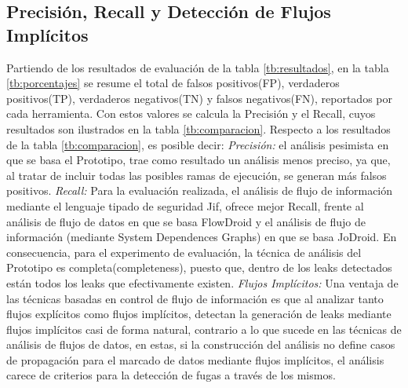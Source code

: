\subsection{Precisión, Recall y Detección de Flujos Implícitos}
Partiendo de los resultados de evaluación de la tabla \ref{tb:resultados}, 
en la tabla \ref{tb:porcentajes} se resume el total de falsos positivos(FP),
verdaderos positivos(TP), verdaderos negativos(TN) y falsos negativos(FN),
reportados por cada herramienta. Con estos valores se calcula la Precisión y el
Recall, cuyos resultados son ilustrados en la tabla
\ref{tb:comparacion}.\newline 
Respecto a los resultados de la tabla \ref{tb:comparacion}, es posible decir: 
\emph{Precisión:} el análisis pesimista en que se basa el Prototipo, trae como
resultado un análisis menos preciso, ya que, al tratar de incluir todas las
posibles ramas de ejecución, se generan más falsos positivos.\newline 
\emph{Recall:} Para la evaluación realizada, el análisis de flujo de información
mediante el lenguaje tipado de seguridad Jif, ofrece mejor Recall, frente al análisis
de flujo de datos en que se basa FlowDroid y el análisis de flujo de información
(mediante System Dependences Graphs) en que se basa JoDroid. En consecuencia,
para el experimento de evaluación, la técnica de análisis del Prototipo es
completa(completeness), puesto que, dentro de los leaks detectados están todos
los leaks que efectivamente existen.\newline 
\emph{Flujos Implícitos:} Una ventaja de las técnicas basadas en control de
flujo de información es que al analizar tanto flujos explícitos como flujos implícitos,
detectan la generación de leaks mediante flujos implícitos casi de forma
natural, contrario a lo que sucede en las técnicas de análisis de flujos de
datos, en estas, si la construcción del análisis no define casos de propagación
para el marcado de datos mediante flujos implícitos, el análisis carece de
criterios para la detección de fugas a través de los mismos.\newline
\begin{table}[t]
\begin{center}
\small
{}
\end{center}
\caption{Resultados de precisión para FlowDroid y Prototipo. Resume el total de
FP, TP, TN y FN}
\label{tb:porcentajes}
\end{table}

